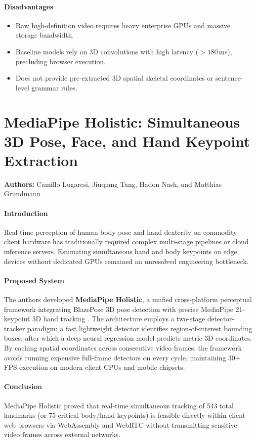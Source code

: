 \paragraph{Disadvantages}
\begin{itemize}
    \item Raw high-definition video requires heavy enterprise GPUs and massive storage bandwidth.
    \item Baseline models rely on 3D convolutions with high latency ($>180$\,ms), precluding browser execution.
    \item Does not provide pre-extracted 3D spatial skeletal coordinates or sentence-level grammar rules.
\end{itemize}

\section{MediaPipe Holistic: Simultaneous 3D Pose, Face, and Hand Keypoint Extraction}
\textbf{Authors:} Camillo Lugaresi, Jiuqiang Tang, Hadon Nash, and Matthias Grundmann \cite{2,3,4}

\paragraph{Introduction}
Real-time perception of human body pose and hand dexterity on commodity client hardware has traditionally required complex multi-stage pipelines or cloud inference servers. Estimating simultaneous hand and body keypoints on edge devices without dedicated GPUs remained an unresolved engineering bottleneck.

\paragraph{Proposed System}
The authors developed \textbf{MediaPipe Holistic}, a unified cross-platform perceptual framework integrating BlazePose 3D pose detection \cite{4} with precise MediaPipe 21-keypoint 3D hand tracking \cite{3}. The architecture employs a two-stage detector-tracker paradigm: a fast lightweight detector identifies region-of-interest bounding boxes, after which a deep neural regression model predicts metric 3D coordinates. By caching spatial coordinates across consecutive video frames, the framework avoids running expensive full-frame detectors on every cycle, maintaining 30+ FPS execution on modern client CPUs and mobile chipsets.

\paragraph{Conclusion}
MediaPipe Holistic proved that real-time simultaneous tracking of 543 total landmarks (or 75 critical body/hand keypoints) is feasible directly within client web browsers via WebAssembly and WebRTC without transmitting sensitive video frames across external networks.

